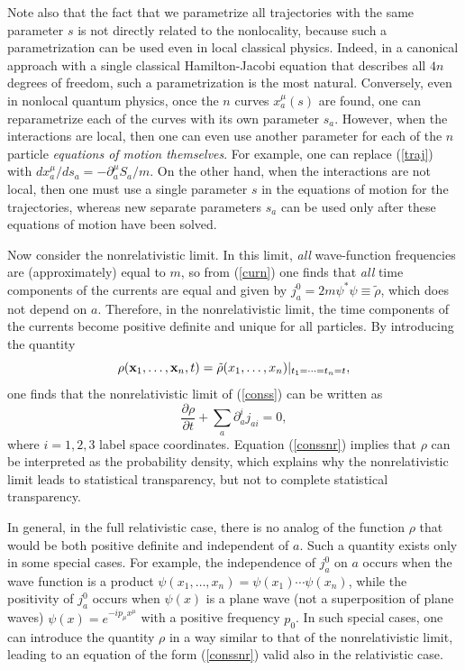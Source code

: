 \documentclass[11pt]{article}
\begin{document}
Note also that the fact
that we parametrize all trajectories with the same parameter $s$ 
is not directly related to the nonlocality, because such a parametrization 
can be used even in local classical physics. Indeed, in a canonical approach 
with a single classical Hamilton-Jacobi equation 
that describes all $4n$ degrees 
of freedom, such a parametrization is the most natural. 
Conversely, 
even in nonlocal quantum physics, once the 
$n$ curves $x^{\mu}_a(s)$ are found, one can reparametrize each 
of the curves with its own parameter $s_a$. However, when the interactions 
are local, then one can even use another parameter for each of the 
$n$ particle {\em equations of motion themselves}. 
For example, one can replace (\ref{traj}) with 
$dx_a^{\mu}/ds_a = -\partial_a^{\mu}S_a/m$. On the other hand, 
when the interactions 
are not local, then one must use a single parameter $s$ in the 
equations of motion for the trajectories, whereas new separate parameters 
$s_a$ can be used only after these equations of motion have been solved.

Now consider the nonrelativistic limit. In this limit, {\em all}  
wave-function frequencies are (approximately) equal to $m$, so 
from (\ref{curn}) one finds that {\em all}
time components of the currents are equal and given by 
$j^0_a=2m\psi^*\psi\equiv\tilde{\rho}$, which does not depend on $a$. 
Therefore, 
in the nonrelativistic limit, the time components of the currents 
become positive definite and unique for all particles. 
By introducing the quantity
\begin{equation}
\rho({\bf x}_1,\ldots ,{\bf x}_n,t)=
\tilde{\rho}(x_1,\ldots ,x_n)|_{t_1=\cdots =t_n=t}, 
\end{equation}
one finds that the nonrelativistic limit of (\ref{conss}) can be written 
as    
\begin{equation}\label{conssnr}
\frac{\partial\rho}{\partial t}+  \sum_a\partial^{i}_a j_{ai}=0,
\end{equation}   
where $i=1,2,3$ label space coordinates. Equation (\ref{conssnr}) 
implies that $\rho$ can be interpreted as the probability density, 
which explains why the nonrelativistic limit leads to  
statistical transparency, but not to complete statistical 
transparency. 

In general, 
in the full relativistic case, there is no analog of the function 
$\rho$ that would be both positive definite and independent of $a$. 
Such a quantity exists only in some special cases.
For example, the independence of 
$j^0_a$ on $a$ occurs when the wave function is a product 
$\psi(x_1,\ldots ,x_n)=\psi(x_1)\cdots\psi(x_n)$, while the 
positivity of $j^0_a$ occurs when $\psi(x)$ is a plane wave 
(not a superposition of plane waves) $\psi(x)=e^{-ip_{\mu}x^{\mu}}$
with a positive frequency $p_0$. 
%
%
In such special cases, 
one can introduce the quantity $\rho$ in a way similar to that 
of the nonrelativistic limit, leading to an equation 
of the form (\ref{conssnr}) valid also in the relativistic 
case.
\end{document}
